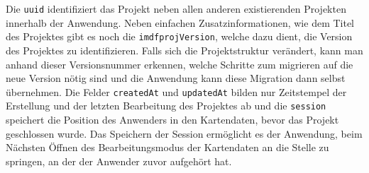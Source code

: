 Die \texttt{uuid} identifiziert das Projekt neben allen anderen existierenden Projekten innerhalb der Anwendung.
Neben einfachen Zusatzinformationen, wie dem Titel des Projektes gibt es noch die \texttt{imdfprojVersion}, welche dazu dient, die Version des Projektes zu identifizieren.
Falls sich die Projektstruktur verändert, kann man anhand dieser Versionsnummer erkennen, welche Schritte zum migrieren auf die neue Version nötig sind und die Anwendung kann diese Migration dann selbst übernehmen.
Die Felder \texttt{createdAt} und \texttt{updatedAt} bilden nur Zeitstempel der Erstellung und der letzten Bearbeitung des Projektes ab und die \texttt{session} speichert die Position des Anwenders in den Kartendaten, bevor das Projekt geschlossen wurde.
Das Speichern der Session ermöglicht es der Anwendung, beim Nächsten Öffnen des Bearbeitungsmodus der Kartendaten an die Stelle zu springen, an der der Anwender zuvor aufgehört hat.

